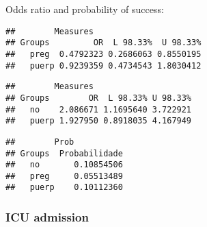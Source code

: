 \documentclass[
]{article}
\newenvironment{Shaded}{\begin{snugshade}}{\end{snugshade}}
\newcommand{\CommentTok}[1]{\textcolor[rgb]{0.56,0.35,0.01}{\textit{#1}}}
\newcommand{\KeywordTok}[1]{\textcolor[rgb]{0.13,0.29,0.53}{\textbf{#1}}}
\newcommand{\NormalTok}[1]{#1}
\newcommand{\OperatorTok}[1]{\textcolor[rgb]{0.81,0.36,0.00}{\textbf{#1}}}
\newcommand{\StringTok}[1]{\textcolor[rgb]{0.31,0.60,0.02}{#1}}
\begin{document}
Odds ratio and probability of success:

\begin{Shaded}
\end{Shaded}

\begin{verbatim}
##        Measures
## Groups         OR  L 98.33%  U 98.33%
##   preg  0.4792323 0.2686063 0.8550195
##   puerp 0.9239359 0.4734543 1.8030412
\end{verbatim}

\begin{Shaded}
\end{Shaded}

\begin{verbatim}
##        Measures
## Groups        OR  L 98.33% U 98.33%
##   no    2.086671 1.1695640 3.722921
##   puerp 1.927950 0.8918035 4.167949
\end{verbatim}

\begin{Shaded}
\end{Shaded}

\begin{verbatim}
##        Prob
## Groups  Probabilidade
##   no       0.10854506
##   preg     0.05513489
##   puerp    0.10112360
\end{verbatim}

\hypertarget{icu-admission-1}{%
\subsubsection{ICU admission}\label{icu-admission-1}}

\begin{Shaded}
\end{Shaded}
\end{document}
